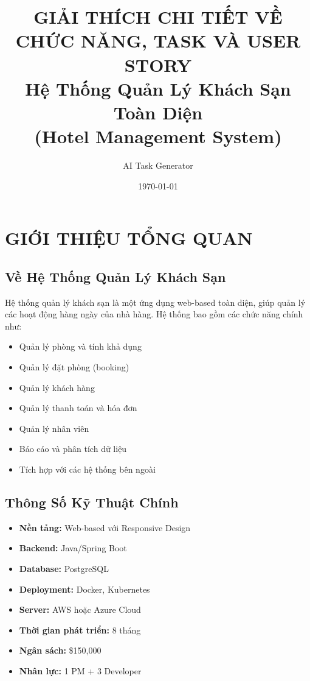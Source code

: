 \documentclass[12pt, a4paper]{report}
\title{\textbf{GIẢI THÍCH CHI TIẾT VỀ CHỨC NĂNG, TASK VÀ USER STORY}\\
\textbf{Hệ Thống Quản Lý Khách Sạn Toàn Diện}\\
\large (Hotel Management System)}
\author{AI Task Generator}
\date{\today}
\begin{document}
\maketitle

\tableofcontents
\newpage

\chapter{GIỚI THIỆU TỔNG QUAN}

\section{Về Hệ Thống Quản Lý Khách Sạn}

Hệ thống quản lý khách sạn là một ứng dụng web-based toàn diện, giúp quản lý các hoạt động hàng ngày của nhà hàng. Hệ thống bao gồm các chức năng chính như:

\begin{itemize}
    \item Quản lý phòng và tính khả dụng
    \item Quản lý đặt phòng (booking)
    \item Quản lý khách hàng
    \item Quản lý thanh toán và hóa đơn
    \item Quản lý nhân viên
    \item Báo cáo và phân tích dữ liệu
    \item Tích hợp với các hệ thống bên ngoài
\end{itemize}

\section{Thông Số Kỹ Thuật Chính}

\begin{itemize}
    \item \textbf{Nền tảng:} Web-based với Responsive Design
    \item \textbf{Backend:} Java/Spring Boot
    \item \textbf{Database:} PostgreSQL
    \item \textbf{Deployment:} Docker, Kubernetes
    \item \textbf{Server:} AWS hoặc Azure Cloud
    \item \textbf{Thời gian phát triển:} 8 tháng
    \item \textbf{Ngân sách:} \$150,000
    \item \textbf{Nhân lực:} 1 PM + 3 Developer
\end{itemize}
\end{document}
